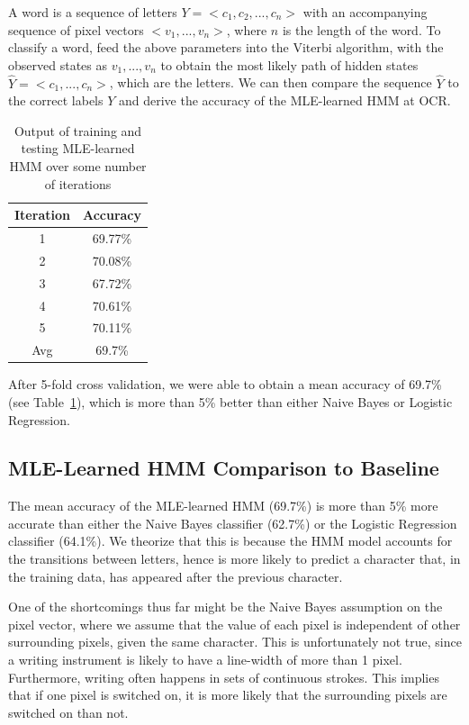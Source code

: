 \documentclass{article} %
\begin{document}
A word is a sequence of letters $Y = <c_1, c_2, ..., c_n>$ with an accompanying sequence of pixel vectors $<v_1, ..., v_n>$, where $n$ is the length of the word. To classify a word, feed the above parameters into the Viterbi algorithm, with the observed states as $v_1, ..., v_n$ to obtain the most likely path of hidden states $\hat{Y} = <c_1, ..., c_n>$, which are the letters. We can then compare the sequence $\hat{Y}$ to the correct labels $Y$ and derive the accuracy of the MLE-learned HMM at OCR.

\begin{table}[h]
\centering
\begin{tabular}{|c|c|}
\hline
Iteration & Accuracy \\
\hline
1 & 69.77\% \\
2 & 70.08\% \\
3 & 67.72\% \\
4 & 70.61\% \\
5 & 70.11\% \\
\hline
Avg & 69.7\% \\ 
\hline
\end{tabular}
\caption{Output of training and testing MLE-learned HMM over some number of iterations}
\label{tab:mle-hmm-results}
\end{table}


After 5-fold cross validation, we were able to obtain a mean accuracy of 69.7\% (see Table~\ref{tab:mle-hmm-results}), which is more than 5\% better than either Naive Bayes or Logistic Regression.


\subsection{MLE-Learned HMM Comparison to Baseline}

The mean accuracy of the MLE-learned HMM (69.7\%) is more than 5\% more accurate than either the Naive Bayes classifier (62.7\%) or the Logistic Regression classifier (64.1\%). We theorize that this is because the HMM model accounts for the transitions between letters, hence is more likely to predict a character that, in the training data, has appeared after the previous character.

One of the shortcomings thus far might be the Naive Bayes assumption on the pixel vector, where we assume that the value of each pixel is independent of other surrounding pixels, given the same character. This is unfortunately not true, since a writing instrument is likely to have a line-width of more than 1 pixel. Furthermore, writing often happens in sets of continuous strokes. This implies that if one pixel is switched on, it is more likely that the surrounding pixels are switched on than not.
\end{document}
